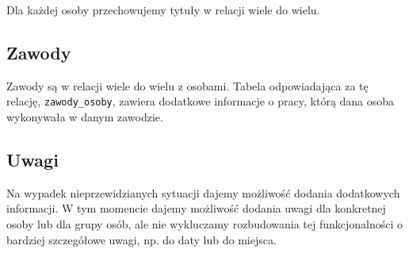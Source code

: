 \documentclass{article}
\begin{document}
Dla każdej osoby przechowujemy tytuły w relacji wiele do wielu.

\subsection{Zawody}

Zawody są w relacji wiele do wielu z osobami. Tabela odpowiadająca za tę relację, \texttt{zawody\_osoby}, zawiera dodatkowe informacje o pracy, którą dana osoba wykonywała w danym zawodzie.

\subsection{Uwagi}

Na wypadek nieprzewidzianych sytuacji dajemy możliwość dodania dodatkowych informacji. W tym momencie dajemy możliwość dodania uwagi dla konkretnej osoby lub dla grupy osób, ale nie wykluczamy rozbudowania tej funkcjonalności o bardziej szczegółowe uwagi, np. do daty lub do miejsca.
\end{document}
